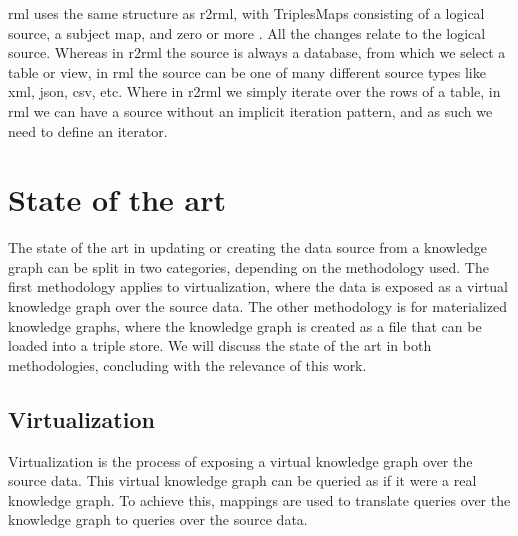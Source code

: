 \acrshort{rml} uses the same structure as \acrshort{r2rml}, with TriplesMaps consisting of a logical source, a subject map, and zero or more . All the changes relate to the logical source. Whereas in \acrshort{r2rml} the source is always a database, from which we select a table or view, in \acrshort{rml} the source can be one of many different source types like \acrshort{xml}, \acrshort{json}, \acrshort{csv}, etc. Where in \acrshort{r2rml} we simply iterate over the rows of a table, in \acrshort{rml} we can have a source without an implicit iteration pattern, and as such we need to define an iterator.


\section{State of the art}
The state of the art in updating or creating the data source from a knowledge graph can be split in two categories, depending on the methodology used. The first methodology applies to virtualization, where the data is exposed as a virtual knowledge graph over the source data. The other methodology is for materialized knowledge graphs, where the knowledge graph is created as a file that can be loaded into a triple store. We will discuss the state of the art in both methodologies, concluding with the relevance of this work.

\subsection{Virtualization}
Virtualization is the process of exposing a virtual knowledge graph over the source data. This virtual knowledge graph can be queried as if it were a real knowledge graph. To achieve this, mappings are used to translate queries over the knowledge graph to queries over the source data.

